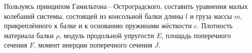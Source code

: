 Пользуясь принципом Гамильтона---Остроградского, составить уравнения
малых колебаний системы, состоящей из консольной балки длины $l$ и груза
массы $m$, прикреплённого к балке и к основанию пружинами жёсткости $c$.
Плотность материала балки $\rho$, модуль продольной упругости $E$,
площадь поперечного сечения $F$, момент инерции поперечного сечения $J$.
